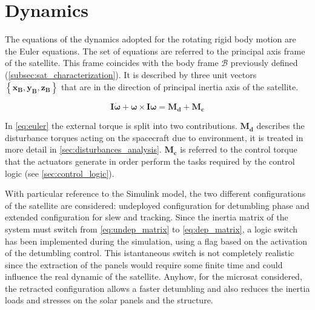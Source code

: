 \section{Dynamics}
\label{sec:dynamics}

The equations of the dynamics adopted for the rotating rigid body motion are the Euler equations. The set of equations are referred to the principal axis frame of the satellite. This frame coincides with the body frame $\mathcal{B}$ previously defined (\autoref{subsec:sat_characterization}). It is described by three unit vectors $\left\{ \boldsymbol{x_B}, \boldsymbol{y_B}, \boldsymbol{z_B} \right\}$ that are in the direction of principal inertia axis of the satellite.

\begin{equation} \label{eq:euler}
    \boldsymbol{I \dot{\omega}} + \boldsymbol{\omega} \times \boldsymbol{I \omega} = \boldsymbol{M_d} + \boldsymbol{M_c}
\end{equation}

In \autoref{eq:euler} the external torque is split into two contributions.
$\boldsymbol{M_d}$ describes the disturbance torques acting on the spacecraft due to environment, it is treated in more detail in \autoref{sec:disturbances_analysis}.
$\boldsymbol{M_c}$ is referred to the control torque that the actuators generate in order perform the tasks required by the control logic (see \autoref{sec:control_logic}).

With particular reference to the Simulink model, the two different configurations of the satellite are considered: undeployed configuration for detumbling phase and extended configuration for slew and tracking. Since the inertia matrix of the system must switch from \autoref{eq:undep_matrix} to \autoref{eq:dep_matrix}, a logic switch has been implemented during the simulation, using a flag based on the activation of the detumbling control.
This istantaneous switch is not completely realistic since the extraction of the panels would require some finite time and could influence the real dynamic of the satellite. Anyhow, for the microsat considered, the retracted configuration allows a faster detumbling and also reduces the inertia loads and stresses on the solar panels and the structure.